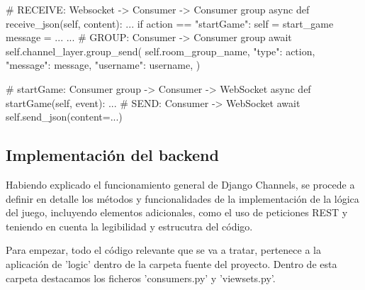 \begin{mypython}[float={h},caption={Broadcast a todos los consumidores y envío final al cliente},label={alg:ReceiveCode}]
						
	# RECEIVE: Websocket -> Consumer -> Consumer group
	async def receive_json(self, content):
		...	
		if action == "startGame":
		self = start_game
		message = {...}
		...	
		# GROUP: Consumer -> Consumer group
		await self.channel_layer.group_send(
		self.room_group_name,
		{"type": action, "message": message, "username": username},
		)
					
	# startGame: Consumer group -> Consumer -> WebSocket
	async def startGame(self, event):
		...
		# SEND: Consumer -> WebSocket
		await self.send_json(content={...})
									
\end{mypython}

\subsection{Implementación del backend}

Habiendo explicado el funcionamiento general de Django Channels, se procede a definir en detalle los métodos y funcionalidades 
de la implementación de la lógica del juego, incluyendo elementos adicionales, como el uso de peticiones REST y teniendo en cuenta 
la legibilidad y estrucutra del código.

Para empezar, todo el código relevante que se va a tratar, pertenece a la aplicación de 'logic' dentro de la carpeta fuente del proyecto.
Dentro de esta carpeta destacamos los ficheros 'consumers.py' y 'viewsets.py'.

